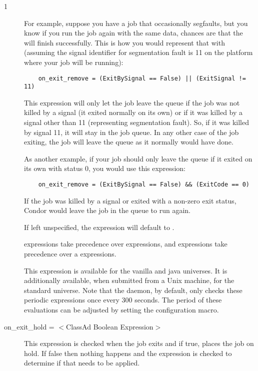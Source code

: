 \begin{ManPage}{\label{man-condor-submit}}{1}
\begin{description}
For example,
suppose you have a job that occasionally segfaults,
but you know if you run the job again with the same data,
chances are that the will finish successfully.
This is
how you would represent that with 
(assuming the signal identifier for segmentation fault is 11 on the
platform where your job will be running):

\begin{verbatim}
	on_exit_remove = (ExitBySignal == False) || (ExitSignal != 11)
\end{verbatim}

This expression will only let the job leave the queue if the job was
not killed by a signal (it exited normally on its own) or if it was
killed by a signal other than 11 (representing segmentation fault).
So, if it was killed by signal 11, it will stay in the job queue.
In any other case of the job exiting, 
the job will leave the queue as it normally would have done.

As another example,
if your job should only leave the queue if it exited on its own with
status 0,
you would use this  expression: 

\begin{verbatim}
	on_exit_remove = (ExitBySignal == False) && (ExitCode == 0)
\end{verbatim}

If the job was killed by a signal or exited with a non-zero exit
status, Condor would leave the job in the queue to run again.

If left unspecified, the  expression will
default to .
 
 expressions take
precedence over  expressions,
and  expressions take
precedence over a  expressions.

This expression is available for the vanilla and java universes.  It
is additionally available, when submitted from a Unix machine, for the
standard universe.  Note that the  daemon,
by default, only checks
these periodic expressions once every 300 seconds.  The period of
these evaluations can be adjusted by setting the
 configuration macro.



\item[on\_exit\_hold = $<$ClassAd Boolean Expression$>$] This expression
is checked when the job exits and if true, places the job on hold. If false
then nothing happens and the  expression is
checked to determine if that needs to be applied.


\end{description}
\end{ManPage}
